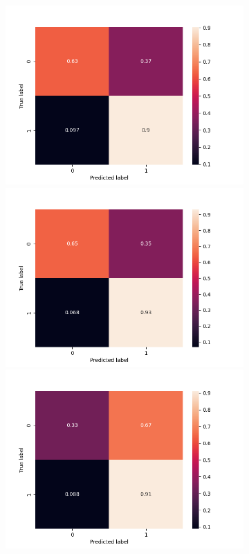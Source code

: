 \begin{figure}
\begin{subfigure}[b]{\textwidth}
      \includegraphics[width=\linewidth]{figures/results/word_embeddings/lgr/take_image/lgr_set_4_confusion_matrix_percent.png}
    \endminipage\hfill
      \includegraphics[width=\linewidth]{figures/results/word_embeddings/lgr/take_image/lgr_set_5_confusion_matrix_percent.png}
    \endminipage\hfill {}%
      \includegraphics[width=\linewidth]{figures/results/word_embeddings/lgr/take_image/lgr_set_6_confusion_matrix_percent.png}

\end{subfigure}
\end{figure}
